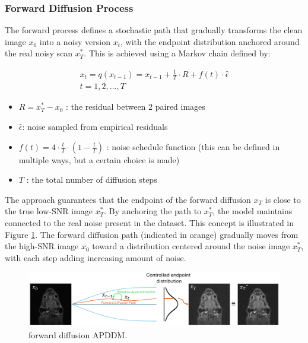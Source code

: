 \documentclass[twocolumn]{article}
\begin{document}
\subsubsection{Forward Diffusion Process}
The forward process defines a stochastic path that gradually transforms the clean image $x_0$ into a noisy version $x_t$, with the endpoint distribution anchored around the real noisy scan $x_T^*$. 
This is achieved using a Markov chain defined by:

\begin{equation}\label{eq:Markov chain}
\begin{split}
x_t=q(x_{t-1})=x_{t-1}+\frac{1}{T}\cdot R+f(t)\cdot \hat{\epsilon}\\
t=1,2,...,T
\end{split}
\end{equation}

\begin{itemize}
    \item $R=x_T^*-x_0$ : the residual between 2 paired images
    \item $\hat{\epsilon} $: noise sampled from empirical residuals
    \item $f(t)=4 \cdot \frac{t}{T} \cdot (1-\frac{t}{T})$ : noise schedule function (this can be defined in multiple ways, but a certain choice is made)
    \item $T$ : the total number of diffusion steps
\end{itemize}


The approach guarantees that the endpoint of the forward diffusion $x_T$ is close to the true low-SNR image $x_T^*$. 
By anchoring the path to $x_T^*$, the model maintains connected to the real noise present in the dataset. 
This concept is illustrated in Figure \ref{fig:forward APDDM}. The forward diffusion path (indicated in orange) gradually moves from the high-SNR image $x_0$ toward a distribution centered around the noise image $x_T^*$, with each step adding increasing amount of noise. 


\begin{figure}
    \centering
    \includegraphics[width=0.8\linewidth]{forward APDDM.png}
    \caption{forward diffusion APDDM.}
    \label{fig:forward APDDM}
\end{figure}
\end{document}
